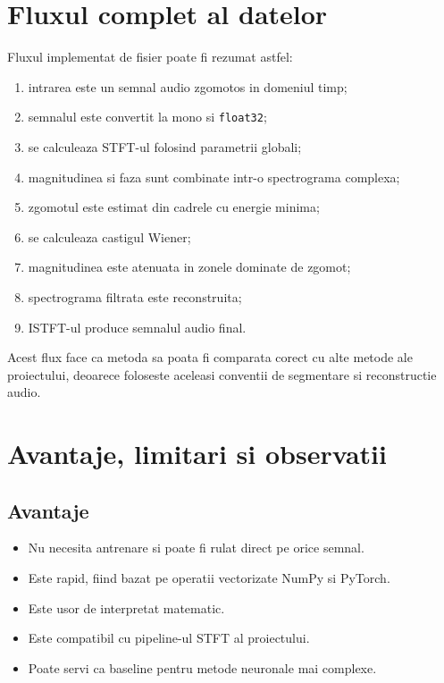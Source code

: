 \documentclass[12pt,a4paper]{report}
\begin{document}
\chapter{Fluxul complet al datelor}

Fluxul implementat de fisier poate fi rezumat astfel:

\begin{enumerate}
    \item intrarea este un semnal audio zgomotos in domeniul timp;
    \item semnalul este convertit la mono si \texttt{float32};
    \item se calculeaza STFT-ul folosind parametrii globali;
    \item magnitudinea si faza sunt combinate intr-o spectrograma complexa;
    \item zgomotul este estimat din cadrele cu energie minima;
    \item se calculeaza castigul Wiener;
    \item magnitudinea este atenuata in zonele dominate de zgomot;
    \item spectrograma filtrata este reconstruita;
    \item ISTFT-ul produce semnalul audio final.
\end{enumerate}

Acest flux face ca metoda sa poata fi comparata corect cu alte metode ale proiectului, deoarece foloseste aceleasi conventii de segmentare si reconstructie audio.

\chapter{Avantaje, limitari si observatii}

\section{Avantaje}

\begin{itemize}
    \item Nu necesita antrenare si poate fi rulat direct pe orice semnal.
    \item Este rapid, fiind bazat pe operatii vectorizate NumPy si PyTorch.
    \item Este usor de interpretat matematic.
    \item Este compatibil cu pipeline-ul STFT al proiectului.
    \item Poate servi ca baseline pentru metode neuronale mai complexe.
\end{itemize}
\end{document}
